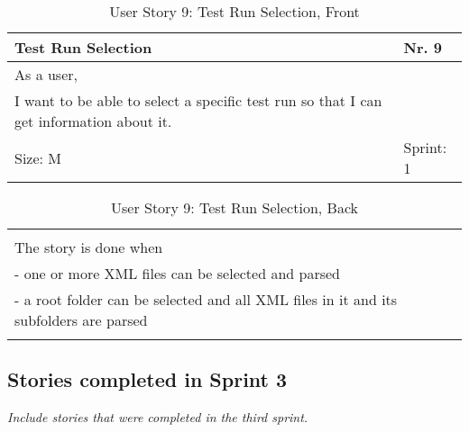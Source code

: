 \begin{table}[H]
  \caption{User Story 9: Test Run Selection, Front}
  \label{Story_9_Front}
  \centering
  \begin{tabular}{|p{9cm} p{2cm}|}
	\hline  	
  	Test Run Selection & Nr. 9 \\ 
  	\hline
  	As a user, &    \\ 
  	I want to be able to select a specific test run so that I can get information about it. &    \\ 
  	Size: M & Sprint: 1 \\ 
  	\hline
  \end{tabular}
\end{table}
\begin{table}[H]
  \caption{User Story 9: Test Run Selection, Back}
  \label{Story_2_Back}
  \centering
  \begin{tabular}{|p{10cm} p{1cm}|}
  \hline
  	  &    \\ 
  	The story is done when &    \\ 
  	 - one or more XML files can be selected and parsed & \\ 
  	 - a root folder can be selected and all XML files in it and its subfolders are parsed & \\  
  	 
  	  &  
  	   \\ 
  	\hline
  \end{tabular}
\end{table}

\subsection*{Stories completed in Sprint 3}
\emph{Include stories that were completed in the third sprint.} 

